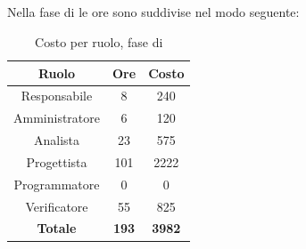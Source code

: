 \subsection{\PA}
Nella fase di \PA{} le ore sono suddivise nel modo seguente:
\begin{table}[H]
	\centering
	\begin{tabular}{|c|c|c|}
		\hline
		\textbf{Ruolo} &
		\textbf{Ore} &
		\textbf{Costo} \\
		\hline
		Responsabile & 8 & 240\\
		\hline
		Amministratore & 6 & 120\\
		\hline
		Analista & 23 & 575\\
		\hline
		Progettista & 101 & 2222 \\
		\hline
		Programmatore & 0 & 0 \\
		\hline
		Verificatore & 55 & 825\\
		\hline
		\textbf{Totale} & \textbf{193} & \textbf{3982} \\
		\hline
	\end{tabular}
	\caption{Costo per ruolo, fase di \PA}
\end{table}

